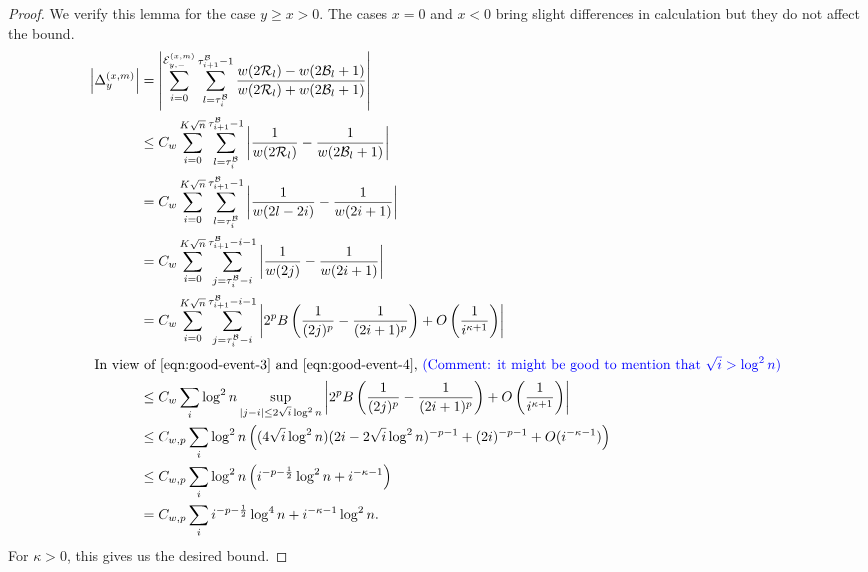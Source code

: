 \documentclass[twoside,12pt, a4paper]{article}
\numberwithin{equation}{section}
\theoremstyle{remark}
\newcommand{\edt}[1]{\textcolor{red}{#1}} %
\newcommand{\comment}[1]{\textcolor{blue}{(Comment: #1)}}
\begin{document}
\begin{proof}%
	We verify this lemma for the case $y \ge  x > 0$. The cases $x = 0$ and $x<0$ bring slight differences in calculation but they do not affect the bound.
	\begin{align*}
		\left| \Delta_y^{(x,m)} \right| 
		&= 
		\left| 	\sum_{i = 0}^{\mathcal{E}_{y,-}^{(x,m)}} 
		\sum_{l = \tau_i^{\mathcal{B}}} ^{\tau_{i+1}^{\mathcal{B}}  -1}
		\frac{w(2 \mathcal{R}_l)- w(2 \mathcal{B}_l + 1)}{w(2 \mathcal{R}_l)+ w(2 \mathcal{B}_l + 1)}
		\right| \\
		&\le C_w \sum_{i = 0}^{K \sqrt{n} } \sum_{l = \tau_i^{\mathcal{B}}} ^{\tau_{i+1}^{\mathcal{B}}  -1}
		\left| \frac{1}{w(2 \mathcal{R}_l)} - \frac{1}{w(2 \mathcal{B}_l + 1)} \right|  \\
		&= C_w \sum_{i = 0}^{K \sqrt{n} } \sum_{l = \tau_i^{\mathcal{B}}} ^{\tau_{i+1}^{\mathcal{B}}  -1}
		\left| \frac{1}{w(2 l - 2 i)} - \frac{1}{w(2i + 1)} \right|  \\
		&= C_w \sum_{i = 0}^{K \sqrt{n} }
		\sum_{j = \tau_i^{\mathcal{B}} - i}^{\tau_{i+1}^{\mathcal{B}} - i - 1} \left| \frac{1}{w(2j)} - \frac{1}{w(2i + 1)} \right|  \\
		&= C_w \sum_{i = 0}^{K \sqrt{n} }
 		\sum_{j = \tau_i^{\mathcal{B}} - i}^{\tau_{i+1}^{\mathcal{B}} - i - 1} \left|  2^p B\left( \frac{1}{(2j)^p} - \frac{1}{(2i + 1)^p} \right)  + O\left( \frac{1}{i^{\kappa + 1}} \right) \right|  \\
		\intertext{
			In view of \eqref{eqn:good-event-3} and \eqref{eqn:good-event-4}, \comment{it might be good to mention that $\sqrt{i} > \log^2{n}$}
		}
		&\le C_w \sum_i \log^2 n \sup_{|j - i| \le 2 \sqrt{i}  \log^2 n} \left|  2^p B\left( \frac{1}{(2j)^p} - \frac{1}{(2i + 1)^p} \right)  + O\left( \frac{1}{i^{\kappa + 1}} \right) \right| \\
		&\le C_{w, p} \sum_i \log^2 n \left( 
		(4 \sqrt{ i } \log^2 n) (2 i - 2 \sqrt{ i } \log^2 n)^{- p - 1} + (2 i)^{- p - 1} + O(i^{- \kappa - 1})
		\right)  \\
		&\le C_{w, p} \sum_i \log^2 n \left( i ^{-p - \frac{1}{2}} \log^2 n +  i^{- \kappa - 1} \right)  \\
		&= C_{w, p} \sum_i i^{- p - \frac{1}{2}} \log^4 n + i^{- \kappa - 1 } \log^2 n
		.\end{align*} 
	For $\kappa>0$, this gives us the desired bound.
\end{proof}
\end{document}
